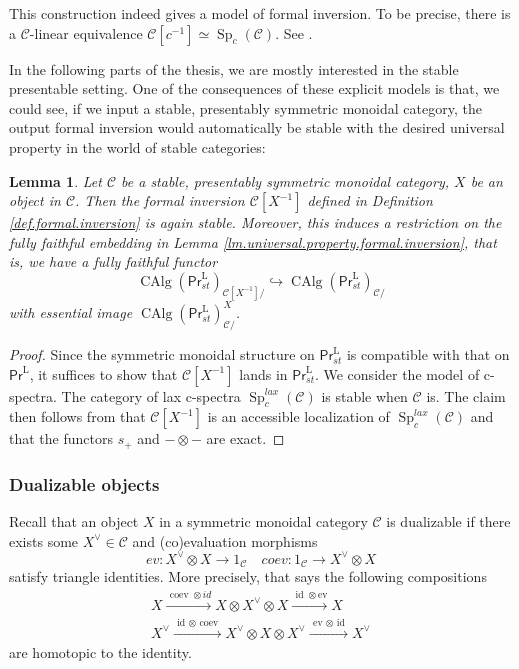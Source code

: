 \documentclass{article}
\newtheorem{lm}[thm]{Lemma}
\theoremstyle{definition}
\newcommand{\on}{\operatorname}
\newcommand{\PrL}{\mathsf{Pr}^\mathrm{L} }
\begin{document}
This construction indeed gives a model of formal inversion. To be precise, there is a $\mathcal{C}$-linear equivalence $\mathcal{C}[c^{-1}]\simeq\on{Sp}_c(\mathcal{C})$. See \cite[Proposition 1.3.14]{AI}.



In the following parts of the thesis, we are mostly interested in the stable presentable setting. One of the consequences of these explicit models is that, we could see, if we input a stable, presentably symmetric monoidal category, the output formal inversion would automatically be stable with the desired universal property in the world of stable categories:
\begin{lm}\label{lm.stable.universal.property}
Let $\mathcal{C}$ be a stable, presentably symmetric monoidal category, $X$ be an object in $\mathcal{C}$. Then the formal inversion $\mathcal{C}[X^{-1}]$ defined in Definition \ref{def.formal.inversion} is again stable. Moreover, this induces a restriction on the fully faithful embedding in Lemma \ref{lm.universal.property.formal.inversion}, that is, we have a fully faithful functor\[\on{CAlg}(\PrL_{st})_{\mathcal{C}[X^{-1}]/} \hookrightarrow \on{CAlg}(\PrL_{st})_{\mathcal{C}/}\]
with essential image $\on{CAlg}(\PrL_{st})^X_{\mathcal{C}/}$.
\end{lm}
\begin{proof}
Since the symmetric monoidal structure on $\PrL_{st}$ is compatible with that on $\PrL$, it suffices to show that $\mathcal{C}[X^{-1}]$ lands in $\PrL_{st}$. We consider the model of c-spectra. The category of lax c-spectra $\on{Sp}_c^{lax}(\mathcal{C})$ is stable when $\mathcal{C}$ is. The claim then follows from \cite[Lemma 1.3.9]{AI} that $\mathcal{C}[X^{-1}]$ is an accessible localization of $\on{Sp}_c^{lax}(\mathcal{C})$ and that the functors $s_+$ and $-\otimes-$ are exact.
\end{proof}





\subsubsection{Dualizable objects}
Recall that an object $X$ in a symmetric monoidal category $\mathcal{C}$ is dualizable if there exists some $X^\vee\in\mathcal{C}$ and (co)evaluation morphisms\[
ev: X^\vee\otimes X\rightarrow 1_\mathcal{C} \quad coev: 1_\mathcal{C}\rightarrow X^\vee\otimes X\]
satisfy triangle identities. More precisely, that says the following compositions
$$
\begin{gathered}
X \xrightarrow{\text { coev } \otimes i d} X \otimes X^\vee \otimes X \xrightarrow{\text { id } \otimes \mathrm{ev}} X \\
X^\vee \xrightarrow{\text { id } \otimes \text { coev }} X^\vee \otimes X \otimes X^\vee \xrightarrow{\text { ev } \otimes \text { id }} X^\vee
\end{gathered}
$$
are homotopic to the identity.
\end{document}
